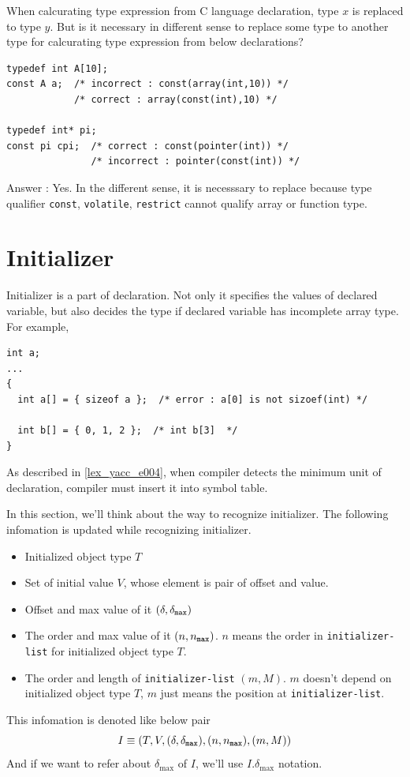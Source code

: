 \begin{QandA}
When calcurating type expression from C language declaration,
type $x$ is replaced to type $y$. But is it necessary in different sense to
replace
some type to another type for calcurating type expression
from below declarations?

\begin{verbatim}
typedef int A[10];
const A a;  /* incorrect : const(array(int,10)) */
            /* correct : array(const(int),10) */

typedef int* pi;
const pi cpi;  /* correct : const(pointer(int)) */
               /* incorrect : pointer(const(int)) */
\end{verbatim}

Answer : Yes. In the different sense, it is necesssary
to replace because type qualifier
 {\tt{const}}, {\tt{volatile}}, {\tt{restrict}}
cannot qualify array or function type.
\end{QandA}

\section{Initializer}
\label{decl_e005}
Initializer is a part of declaration.
Not only it specifies the values of declared variable, but also
decides the type if declared variable has incomplete array type.
For example,
\begin{verbatim}
int a;
...
{
  int a[] = { sizeof a };  /* error : a[0] is not sizoef(int) */

  int b[] = { 0, 1, 2 };  /* int b[3]  */
}
\end{verbatim}
As described in \ref{lex_yacc_e004},
when compiler detects the minimum unit of declaration,
compiler must insert it into symbol table.

In this section, we'll think about the way to recognize
initializer. The following infomation is updated
while recognizing initializer.
\begin{itemize}
\item Initialized object type $T$
\item Set of initial value $V$, whose element is pair of offset and value.
\item Offset and max value of it $({\delta},{\delta}_{\tt{max}})$
\item The order and max value of it $(n,n_{\tt{max}})$.
      $n$ means the order in {\tt{initializer-list}} for initialized
      object type $T$.
\item The order and length of {\tt{initializer-list}} $(m,M)$.
      $m$ doesn't depend on initialized object type $T$,
      $m$ just means the position
      at {\tt{initializer-list}}. 
\end{itemize}
This infomation is denoted like below pair
\[
I \equiv (T,V,({\delta},{\delta}_{\tt{max}}),(n,n_{\tt{max}}),(m,M)) 
\]
And if we want to refer about $\delta_{\max}$ of $I$, we'll
use  $I.\delta_{\max}$ notation.


